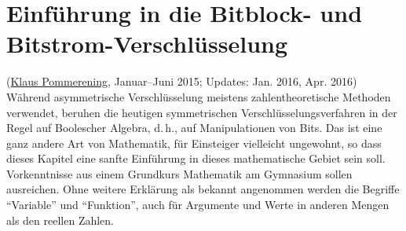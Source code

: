 
\begin{refsegment}







\setcounter{satz}{0}
\setcounter{definition}{0}


\hypertarget{Chapter_BitCiphers}{}   %
\chapter{Einführung in die Bitblock- und Bitstrom-Verschlüsselung}
\label{Chapter_BitCiphers}
(\hyperlink{author_Klaus-Pommerening}{Klaus Pommerening},
 Januar--Juni 2015; Updates: Jan. 2016, Apr. 2016) \\

Während asymmetrische Verschlüsselung meistens zahlentheoretische Methoden
verwendet, beruhen die heutigen symmetrischen
Verschlüsselungsverfahren
in der Regel auf Boolescher Algebra,
d.\,h., auf Manipulationen von Bits.
Das ist eine ganz andere Art von Mathematik, für Einsteiger vielleicht
ungewohnt, so dass dieses Kapitel eine sanfte Einführung in dieses mathematische
Gebiet sein soll. Vorkenntnisse aus einem Grundkurs Mathematik am Gymnasium
sollen ausreichen. Ohne weitere Erklärung als bekannt
angenommen werden die Begriffe "`Variable"' und "`Funktion"', auch für Argumente
und Werte in anderen Mengen als den reellen Zahlen.


\end{refsegment}
